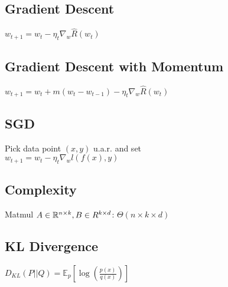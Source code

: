 \subsection*{Gradient Descent}
$w_{t+1} = w_t - \eta_t \nabla_w \hat{R}(w_t)$
\subsection*{Gradient Descent with Momentum} $w_{t+1}=w_t+m(w_t-w_{t-1})-\eta_t \nabla_w \hat{R}(w_t)$
\subsection*{SGD}
Pick data point $(x,y)$ u.a.r. and	set\\  $w_{t+1} = w_t - \eta_t \nabla_w l(f(x),y)$
\subsection*{Complexity}
Matmul $A\in\mathbb{R}^{n\times k},B\in R^{k\times d}$: $\Theta(n\times k\times d)$

\subsection*{KL Divergence}
$D_{KL}(P||Q) = \mathbb{E}_p[\log(\frac{p(x)}{q(x)})]$
\\